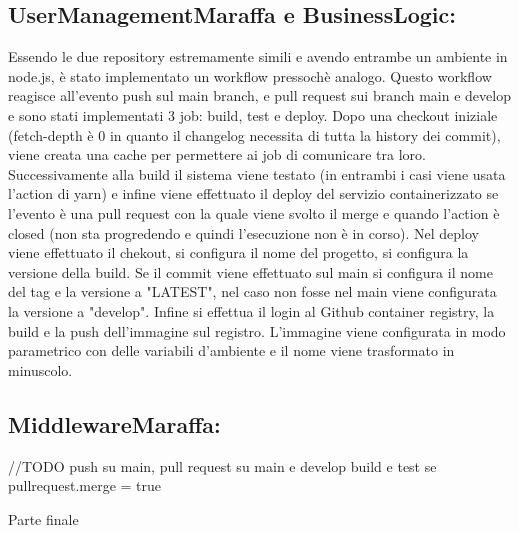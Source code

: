 \subsection{UserManagementMaraffa e BusinessLogic:} Essendo le due repository estremamente simili e avendo entrambe un ambiente in node.js, è stato implementato un workflow pressochè analogo. Questo workflow reagisce all'evento push sul main branch, e pull request sui branch main e develop 
e sono stati implementati 3 job: build, test e deploy.
Dopo una checkout iniziale (fetch-depth è 0 in quanto il changelog necessita di tutta la history dei commit), viene creata una cache per permettere ai job di comunicare tra loro. Successivamente alla build il sistema viene testato (in entrambi i casi viene usata l'action di yarn) e infine viene effettuato il deploy del servizio containerizzato se l'evento è una pull request con la quale viene svolto il merge e quando l'action è closed (non sta progredendo e quindi l'esecuzione non è in corso). Nel deploy viene effettuato il chekout, si configura il nome del progetto, si configura la versione della build. Se il commit viene effettuato sul main si configura il nome del tag e la versione a "LATEST", nel caso non fosse nel main viene configurata la versione a "develop". Infine si effettua il login al Github container registry, la build e la push dell'immagine sul registro. L'immagine viene configurata in modo parametrico con delle variabili d'ambiente e il nome viene trasformato in minuscolo. 

\subsection{MiddlewareMaraffa:} //TODO
push su main, pull request su main e develop
build e test se pullrequest.merge = true 

Parte finale 


